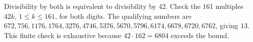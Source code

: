 Divisibility by both is equivalent to divisibility by 42. Check the 161 multiples $42k$, $1\le k\le161$, for both digits. The qualifying numbers are $672,756,1176,1764,3276,4746,5376,5670,5796,6174,6678,6720,6762$, giving $\boxed{13}$. This finite check is exhaustive because $42\cdot162=6804$ exceeds the bound.
